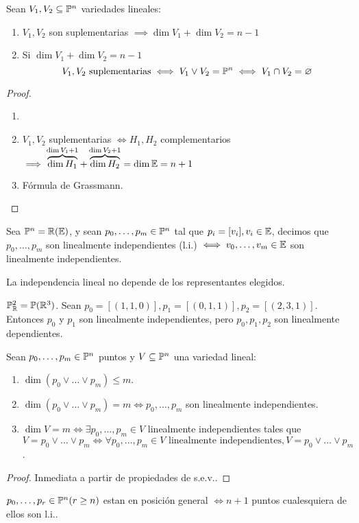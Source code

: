 \begin{prop}
    Sean $V_1, V_2 \subseteq \mathbb{P}^n$ variedades lineales:
    \begin{enumerate}
        \item $V_1, V_2$ son suplementarias $\implies \dim V_1 + \dim V_2 = n-1$
        \item Si $\dim V_1 + \dim V_2 = n-1$
        \[
        V_1, V_2 \text{ suplementarias} \iff V_1 \vee V_2 = \mathbb{P}^n \iff V_1 \cap V_2 = \varnothing
        \]
    \end{enumerate}
\end{prop}
\begin{proof}
    \begin{enumerate}
        \item[]
        \item $V_1, V_2$ suplementarias $\iff H_1, H_2$ complementarios $\implies \overbrace{\dim H_1}^{\dim V_1 + 1} +
        \overbrace{\dim H_2}^{\dim V_2 + 1} = \dim \mathbb{E} = n+1$
        \item Fórmula de Grassmann.
    \end{enumerate}
\end{proof}
\begin{defi}
    Sea $\mathbb{P}^n = \mathbb{R}(\mathbb{E} )$, y sean $p_0, \dots, p_m \in \mathbb{P}^n$ tal que $p_i = [v_i], v_i \in \mathbb{E}$, decimos que $p_0, \dots,
    p_m$ son linealmente independientes (l.i.) $\iff v_0, \dots, v_m \in \mathbb{E}$ son linealmente independientes.
\end{defi}
\begin{obs}
    La independencia lineal no depende de los representantes elegidos.
\end{obs}
\begin{example}
    $\mathbb{P}^2_{\mathbb{R}} = \mathbb{P}(\mathbb{R}^3)$. Sean $p_0 = [(1,1,0)], p_1 = [(0,1,1)], p_2 = [(2,3,1)]$. Entonces $p_0$ y $p_1$ son linealmente
    independientes, pero $p_0, p_1, p_2$ son linealmente dependientes.
\end{example}
\begin{prop}
    Sean $p_0, \dots, p_m \in \mathbb{P}^n$ puntos y $V \subseteq \mathbb{P}^n$ una variedad lineal:
    \begin{enumerate}
        \item $\dim\left( p_0 \vee \dots \vee p_m \right) \leq m$.
        \item $\dim\left( p_0 \vee \dots \vee p_m \right) = m \iff p_0, \dots, p_m$ son linealmente independientes.
        \item $\dim V = m \iff \exists p_0, \dots, p_m \in V$ linealmente independientes tales que $V = p_0 \vee \dots \vee p_m
            \iff \forall p_0, \dots, p_m \in V \text{ linealmente independientes}, V = p_0 \vee \dots \vee p_m$.
    \end{enumerate}
\end{prop}
\begin{proof}
    Inmediata a partir de propiedades de s.e.v..
\end{proof}
\begin{defi}
    $p_0, \dots, p_r \in \mathbb{P}^n (r \geq n)$ estan en posición general $\iff n+1$ puntos cualesquiera de ellos son l.i..
\end{defi}

